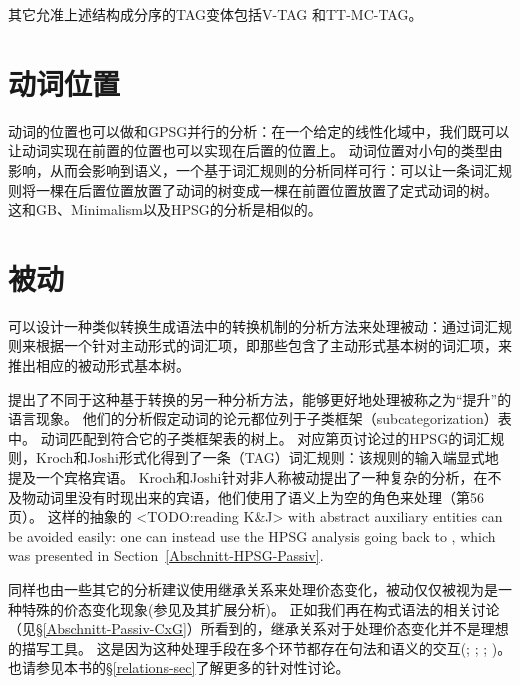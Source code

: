 其它允准上述结构成分序的TAG变体包括V-TAG\citep{Rambow94a} 
和TT-MC-TAG\citep{Lichte2007a}。

\section{动词位置}

动词的位置也可以做和GPSG并行的分析：在一个给定的线性化域中，我们既可以让动词实现在前置的位置也可以实现在后置的位置上。
动词位置对小句的类型由影响，从而会影响到语义，一个基于词汇规则的分析同样可行：可以让一条词汇规则将一棵在后置位置放置了动词的树变成一棵在前置位置放置了定式动词的树。
这和GB、Minimalism以及HPSG的分析是相似的。

\section{被动}

可以设计一种类似转换生成语法中的转换机制的分析方法来处理被动：通过词汇规则来根据一个针对主动形式的词汇项，即那些包含了主动形式基本树的词汇项，来推出相应的被动形式基本树\citep[--51]{KJ85a}。 

\citet[]{KJ85a}提出了不同于这种基于转换的另一种分析方法，能够更好地处理被称之为“提升”的语言现象。
他们的分析假定动词的论元都位列于子类框架（subcategorization）表中。
动词匹配到符合它的子类框架表的树上。
对应第\pageref{pass-lr-mlr}页讨论过的HPSG的词汇规则，Kroch和Joshi形式化得到了一条（TAG）词汇规则：该规则的输入端显式地提及一个宾格宾语。
Kroch和Joshi针对非人称被动提出了一种复杂的分析，在不及物动词里没有时现出来的宾语，他们使用了语义上为空的角色来处理（第56页）。
这样的抽象的
<TODO:reading K\&J>
with abstract auxiliary entities can be avoided easily: one can instead use the HPSG\indexhpsg 
analysis going back to \citet{Haider86}, which was presented in Section~\ref{Abschnitt-HPSG-Passiv}.
\largerpage

同样也由一些其它的分析建议使用继承关系来处理价态变化，被动仅仅被视为是一种特殊的价态变化现象(参见\citealp{Candito96a}及其扩展分析\citealp*{KSYJ2006a})。
正如我们再在构式语法的相关讨论（见\S \ref{Abschnitt-Passiv-CxG}）所看到的，继承关系对于处理价态变化并不是理想的描写工具。
这是因为这种处理手段在多个环节都存在句法和语义的交互(\citealp{Mueller2006d,Mueller2007d}; \citeyear[Section~7.5.2]{MuellerLehrbuch1};
\citeyear{MuellerUnifying}; \citeyear{MWArgSt})。
也请参见本书的\S \ref{relations-sec}了解更多的针对性讨论。 

